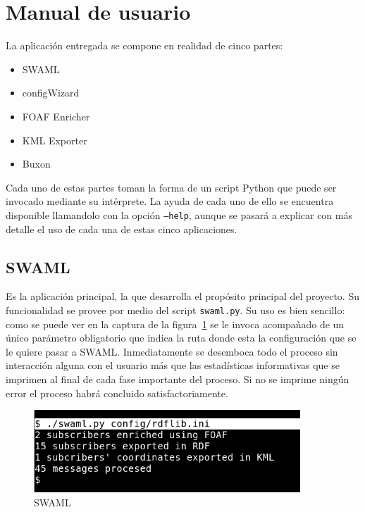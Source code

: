
\section{Manual de usuario}

La aplicación entregada se compone en realidad de cinco partes:

\begin{itemize}
 \item SWAML
 \item configWizard
 \item FOAF Enricher
 \item KML Exporter
 \item Buxon
\end{itemize}

Cada uno de estas partes toman la forma de un script Python que puede ser 
invocado mediante su intérprete. La ayuda de cada uno de ello se encuentra
disponible llamandolo con la opción \texttt{--help}, aunque se pasará a 
explicar con más detalle el uso de cada una de estas cinco aplicaciones.

\subsection*{SWAML}

Es la aplicación principal, la que desarrolla el propósito principal del
proyecto. Su funcionalidad se provee por medio del script \texttt{swaml.py}.
Su uso es bien sencillo: como se puede ver en la captura de la 
figura~\ref{fig:swaml} se le invoca acompañado de un único parámetro obligatorio 
que indica la ruta donde esta la configuración que se le quiere pasar a 
SWAML. Inmediatamente se desemboca todo el proceso sin interacción
alguna con el usuario más que las estadísticas informativas que se 
imprimen al final de cada fase importante del proceso. Si no se
imprime ningún error el proceso habrá concluido satisfactoriamente.

\begin{figure}[H]
	\centering
	\includegraphics[width=10cm]{images/screenshots/swaml.png}
	\caption{SWAML}
	\label{fig:swaml}
\end{figure}


